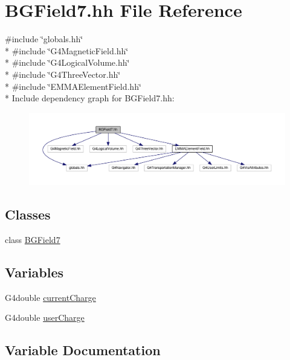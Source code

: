 \hypertarget{BGField7_8hh}{}\section{B\+G\+Field7.\+hh File Reference}
\label{BGField7_8hh}
{\ttfamily \#include \char`\"{}globals.\+hh\char`\"{}}\\*
{\ttfamily \#include \char`\"{}G4\+Magnetic\+Field.\+hh\char`\"{}}\\*
{\ttfamily \#include \char`\"{}G4\+Logical\+Volume.\+hh\char`\"{}}\\*
{\ttfamily \#include \char`\"{}G4\+Three\+Vector.\+hh\char`\"{}}\\*
{\ttfamily \#include \char`\"{}E\+M\+M\+A\+Element\+Field.\+hh\char`\"{}}\\*
Include dependency graph for B\+G\+Field7.\+hh\+:
\nopagebreak
\begin{figure}[H]
\begin{center}
\leavevmode
\includegraphics[width=350pt]{BGField7_8hh__incl}
\end{center}
\end{figure}
\subsection*{Classes}
\begin{DoxyCompactItemize}
\item 
class \hyperlink{classBGField7}{B\+G\+Field7}
\end{DoxyCompactItemize}
\subsection*{Variables}
\begin{DoxyCompactItemize}
\item 
G4double \hyperlink{BGField7_8hh_acb265d8eecfa1acd31056f0c7915362e}{current\+Charge}
\item 
G4double \hyperlink{BGField7_8hh_a2d61cdd1b1b5ed409f7c91b54737c1b9}{user\+Charge}
\end{DoxyCompactItemize}


\subsection{Variable Documentation}
